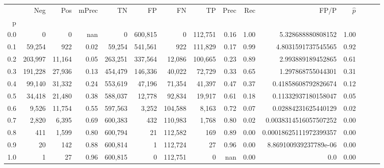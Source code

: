 \begin{tabular}{rrrrrrrrrrrrrrr}
\toprule
{} &      Neg &     Pos & mPrec &       TN &       FP &       FN &       TP &  Prec &   Rec &                    FP/P & $\hat{p}$ \\
p   &          &         &       &          &          &          &          &       &       &                         &           \\
\midrule
0.0 &        0 &       0 &   nan &        0 &  600,815 &        0 &  112,751 &  0.16 &  1.00 &       5.328688880808152 &      1.00 \\
0.1 &   59,254 &     922 &  0.02 &   59,254 &  541,561 &      922 &  111,829 &  0.17 &  0.99 &      4.8031591737545565 &      0.92 \\
0.2 &  203,997 &  11,164 &  0.05 &  263,251 &  337,564 &   12,086 &  100,665 &  0.23 &  0.89 &       2.993889189452865 &      0.61 \\
0.3 &  191,228 &  27,936 &  0.13 &  454,479 &  146,336 &   40,022 &   72,729 &  0.33 &  0.65 &       1.297868755044301 &      0.31 \\
0.4 &   99,140 &  31,332 &  0.24 &  553,619 &   47,196 &   71,354 &   41,397 &  0.47 &  0.37 &     0.41858608792826674 &      0.12 \\
0.5 &   34,418 &  21,480 &  0.38 &  588,037 &   12,778 &   92,834 &   19,917 &  0.61 &  0.18 &     0.11332937180158047 &      0.05 \\
0.6 &    9,526 &  11,754 &  0.55 &  597,563 &    3,252 &  104,588 &    8,163 &  0.72 &  0.07 &     0.02884231625440129 &      0.02 \\
0.7 &    2,820 &   6,395 &  0.69 &  600,383 &      432 &  110,983 &    1,768 &  0.80 &  0.02 &   0.0038314516057507252 &      0.00 \\
0.8 &      411 &   1,599 &  0.80 &  600,794 &       21 &  112,582 &      169 &  0.89 &  0.00 &  0.00018625111972399357 &      0.00 \\
0.9 &       20 &     142 &  0.88 &  600,814 &        1 &  112,724 &       27 &  0.96 &  0.00 &   8.869100939237789e-06 &      0.00 \\
1.0 &        1 &      27 &  0.96 &  600,815 &        0 &  112,751 &        0 &   nan &  0.00 &                     0.0 &      0.00 \\
\bottomrule
\end{tabular}
